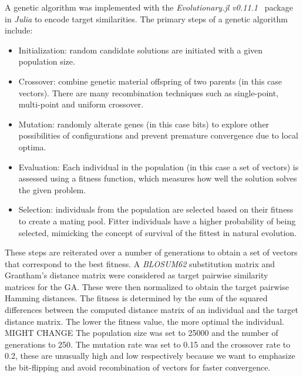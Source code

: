 A genetic algorithm was implemented with the \textit{Evolutionary.jl v0.11.1}~\cite{evojl} package in \textit{Julia} to encode target similarities. The primary steps of a genetic algorithm include:
\begin{itemize}
    \item Initialization: random candidate solutions are initiated with a given population size.
    \item Crossover: combine genetic material offspring of two parents (in this case vectors). There are many recombination techniques such as single-point, multi-point and uniform crossover.
    \item Mutation: randomly alterate genes (in this case bits) to explore other possibilities of configurations and prevent premature convergence due to local optima.
    \item Evaluation: Each individual in the population (in this case a set of vectors) is assessed using a fitness function, which measures how well the solution solves the given problem.
    \item Selection: individuals from the population are selected based on their fitness to create a mating pool. Fitter individuals have a higher probability of being selected, mimicking the concept of survival of the fittest in natural evolution.
\end{itemize}
These steps are reiterated over a number of generations to obtain a set of vectors that correspond to the best fitness. A \textit{BLOSUM62} substitution matrix \cite{blosum} and Grantham's distance matrix \cite{aa_evolution} were considered as target pairwise similarity matrices for the GA. These were then normalized to obtain the target pairwise Hamming distances. The fitness is determined by the sum of the squared differences between the computed distance matrix of an individual and the target distance matrix. The lower the fitness value, the more optimal the individual. MIGHT CHANGE The population size was set to 25000 and the number of generations to 250. The mutation rate was set to 0.15 and the crossover rate to 0.2, these are unusually high and low respectively because we want to emphasize the bit-flipping and avoid recombination of vectors for faster convergence.

